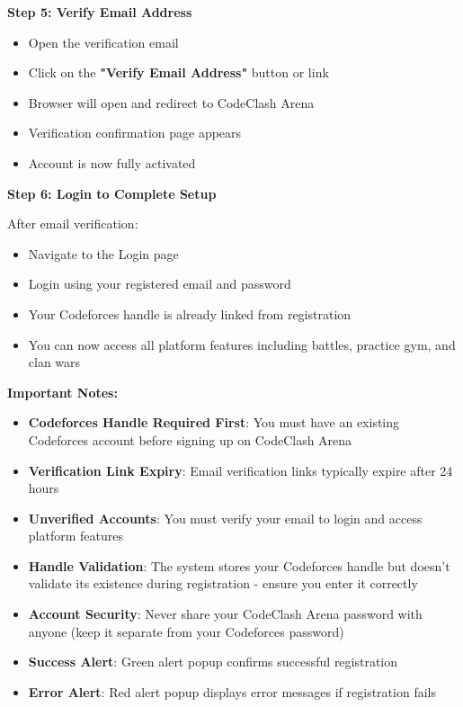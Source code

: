 \documentclass[12pt,a4paper]{article}
\begin{document}
\textbf{Step 5: Verify Email Address}

\begin{itemize}[leftmargin=*]
\item Open the verification email
\item Click on the \textbf{"Verify Email Address"} button or link
\item Browser will open and redirect to CodeClash Arena
\item Verification confirmation page appears
\item Account is now fully activated
\end{itemize}

\textbf{Step 6: Login to Complete Setup}

After email verification:
\begin{itemize}[leftmargin=*]
\item Navigate to the Login page
\item Login using your registered email and password
\item Your Codeforces handle is already linked from registration
\item You can now access all platform features including battles, practice gym, and clan wars
\end{itemize}

\textbf{Important Notes:}
\begin{itemize}[leftmargin=*]
\item \textbf{Codeforces Handle Required First}: You must have an existing Codeforces account before signing up on CodeClash Arena
\item \textbf{Verification Link Expiry}: Email verification links typically expire after 24 hours
\item \textbf{Unverified Accounts}: You must verify your email to login and access platform features
\item \textbf{Handle Validation}: The system stores your Codeforces handle but doesn't validate its existence during registration - ensure you enter it correctly
\item \textbf{Account Security}: Never share your CodeClash Arena password with anyone (keep it separate from your Codeforces password)
\item \textbf{Success Alert}: Green alert popup confirms successful registration
\item \textbf{Error Alert}: Red alert popup displays error messages if registration fails
\end{itemize}
\end{document}
